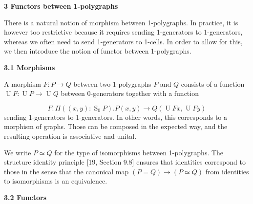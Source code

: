 \documentclass[10pt,a4paper]{amsart}
\begin{document}
 

 
\par\medskip\noindent\textbf{3 Functors between 1-polygraphs}\par
 
 
There is a natural notion of morphism between 1-polygraphs. In practice, it is however too restrictive because it requires sending 1-generators to 1-generators, whereas we often need to send 1-generators to 1-cells. In order to allow for this, we then introduce the notion of functor between 1-polygraphs.\par
 
 
 
\par\medskip\noindent\textbf{3.1 Morphisms}\par
 
 
A morphism $F:P\to Q$ between two 1-polygraphs $P$ and $Q$ consists of a function $\operatorname{U}F:\operatorname{U}P\to\operatorname{U}Q$ between 0-generators together with a function\par
    \[F:\Pi((x,y):\operatorname{S}_{0}P).P(x,y)\to Q(\operatorname{U}Fx,\operatorname{U}Fy)\]    
sending 1-generators to 1-generators. In other words, this corresponds to a morphism of graphs. Those can be composed in the expected way, and the resulting operation is associative and unital.\par
 
 
 
We write $P\simeq Q$ for the type of isomorphisms between 1-polygraphs. The structure identity principle [19, Section 9.8] ensures that identities correspond to those in the sense that the canonical map $(P=Q)\to(P\simeq Q)$ from identities to isomorphisms is an equivalence.\par
 
 
 
 
\par\medskip\noindent\textbf{3.2 Functors}\par
 
 
\end{document}
